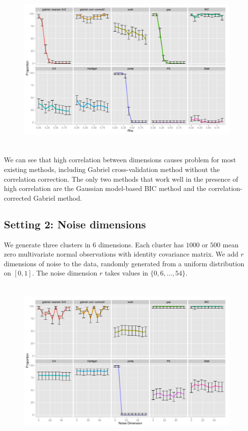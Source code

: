 \documentclass[12pt]{article}
\begin{document}
\begin{figure}[H]
\centering
\includegraphics[width=5.5in, height=3.3in]{New simulation/demo/bench/setting1/Facet.pdf}
\label{fig:setting1}
\end{figure}
	
We can see that high correlation between dimensions causes problem for most
existing methods, including Gabriel cross-validation method without the
correlation correction.  The only two methods that work well in the presence
of high correlation are the Gaussian model-based BIC method
\citep{fraley2002model} and the correlation-corrected Gabriel method. 


\subsection{Setting 2: Noise dimensions}

We generate three clusters in $6$ dimensions. Each cluster has $1000$ or $500$
mean zero multivariate normal observations with identity covariance matrix.
We add $r$ dimensions of noise to the data, randomly generated from a uniform
distribution on $[0,1]$. The noise dimension $r$ takes values in
$\{0,6,...,54\}$. 
	
\begin{figure}[H]
\centering
\includegraphics[width=5.5in, height=3.3in]{New simulation/demo/bench/setting2/Facet.pdf}
\label{fig:setting2}
\end{figure}
\end{document}
